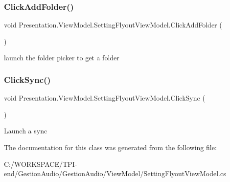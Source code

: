 \subsubsection{\texorpdfstring{Click\+Add\+Folder()}{ClickAddFolder()}}
{\footnotesize\ttfamily void Presentation.\+View\+Model.\+Setting\+Flyout\+View\+Model.\+Click\+Add\+Folder (\begin{DoxyParamCaption}{ }\end{DoxyParamCaption})}



launch the folder picker to get a folder 

\mbox{\label{class_presentation_1_1_view_model_1_1_setting_flyout_view_model_aa4f9ea5fec87225339cfe33d1b8f064d}} 
\subsubsection{\texorpdfstring{Click\+Sync()}{ClickSync()}}
{\footnotesize\ttfamily void Presentation.\+View\+Model.\+Setting\+Flyout\+View\+Model.\+Click\+Sync (\begin{DoxyParamCaption}{ }\end{DoxyParamCaption})}



Launch a sync 



The documentation for this class was generated from the following file\+:\begin{DoxyCompactItemize}
\item 
C\+:/\+W\+O\+R\+K\+S\+P\+A\+C\+E/\+T\+P\+I-\/end/\+Gestion\+Audio/\+Gestion\+Audio/\+View\+Model/Setting\+Flyout\+View\+Model.\+cs\end{DoxyCompactItemize}
